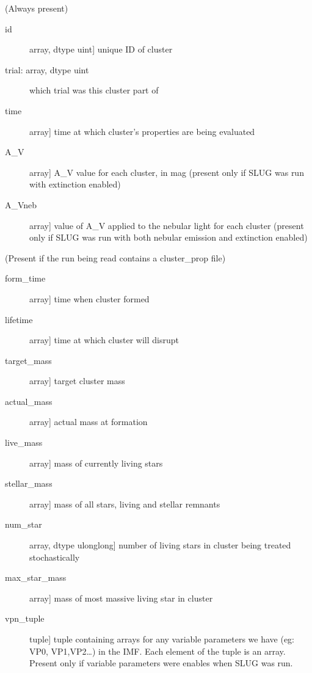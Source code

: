 \documentclass[letterpaper,10pt,english]{sphinxmanual}
\begin{document}
\begin{fulllineitems}
\begin{description}
(Always present)
\begin{description}
\item[{id}] \leavevmode{[}array, dtype uint{]}
unique ID of cluster

\item[{trial: array, dtype uint}] \leavevmode
which trial was this cluster part of

\item[{time}] \leavevmode{[}array{]}
time at which cluster’s properties are being evaluated

\item[{A\_V}] \leavevmode{[}array{]}
A\_V value for each cluster, in mag (present only if SLUG was
run with extinction enabled)

\item[{A\_Vneb}] \leavevmode{[}array{]}
value of A\_V applied to the nebular light for each cluster
(present only if SLUG was run with both nebular emission and
extinction enabled)

\end{description}

(Present if the run being read contains a cluster\_prop file)
\begin{description}
\item[{form\_time}] \leavevmode{[}array{]}
time when cluster formed

\item[{lifetime}] \leavevmode{[}array{]}
time at which cluster will disrupt

\item[{target\_mass}] \leavevmode{[}array{]}
target cluster mass

\item[{actual\_mass}] \leavevmode{[}array{]}
actual mass at formation

\item[{live\_mass}] \leavevmode{[}array{]}
mass of currently living stars

\item[{stellar\_mass}] \leavevmode{[}array{]}
mass of all stars, living and stellar remnants

\item[{num\_star}] \leavevmode{[}array, dtype ulonglong{]}
number of living stars in cluster being treated stochastically

\item[{max\_star\_mass}] \leavevmode{[}array{]}
mass of most massive living star in cluster

\item[{vpn\_tuple}] \leavevmode{[}tuple{]}
tuple containing arrays for any variable parameters we have
(eg: VP0, VP1,VP2…) in the IMF. Each element of the tuple
is an array. Present only if variable parameters were
enables when SLUG was run.


\end{description}
\end{description}
\end{fulllineitems}
\end{document}
